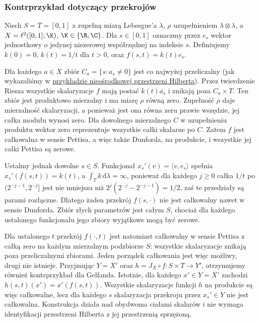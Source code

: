 \subsubsection{Kontrprzykład dotyczący przekrojów}

\begin{przyklad}
\label{ex:weak-fubini-failure15b}
Niech $S=T=[0,1]$ z zupełną miarą Lebesgue'a
$\lambda$, $\rho$ uzupełnieniem $\lambda\otimes\lambda$,
a $X=\ell^2([0,1];\K)$, $\K\in\{\R,\C\}$.
Dla $s\in[0,1]$ oznaczmy przez $e_s$ wektor jednostkowy
o jedynej niezerowej współrzędnej na indeksie $s$.
Definiujemy $k(0)=0$, $k(t)=1/t$ dla $t>0$, oraz
$f(s,t)=k(t)e_s$.

Dla każdego $a\in X$ zbiór $C_a=\{s:a_s\ne0\}$
jest co najwyżej przeliczalny (jak wykazaliśmy
w \hyperref[ex:pettis-not-bochner15b]{przykładzie nieośrodkowej przestrzeni Hilberta}).
Przez twierdzenie Riesza wszystkie skalaryzacje $f$
mają postać $k(t)\overline{a_s}$ i znikają poza
$C_a\times T$. Ten zbiór jest produktowo mierzalny
i ma miarę $\rho$ równą zero. Zupełność $\rho$
daje mierzalność skalaryzacji, a ponieważ jest ona
równa zeru prawie wszędzie, jej całka modułu wynosi zero.
Dla dowolnego mierzalnego $C$ w uzupełnieniu produktu
wektor zero reprezentuje wszystkie całki skalarne
po $C$. Zatem $f$ jest całkowalna w sensie Pettisa,
a więc także Dunforda, na produkcie, i wszystkie
jej całki Pettisa są zerowe.

Ustalmy jednak dowolne $s\in S$. Funkcjonał
$x_s'(v)=\langle v,e_s\rangle$ spełnia
$x_s'(f(s,t))=k(t)$, a $\int_T k\,\mathrm d\lambda=\infty$,
ponieważ dla każdego $j\ge0$ całka $1/t$ po
$(2^{-j-1},2^{-j}]$ jest nie mniejsza niż
$2^j(2^{-j}-2^{-j-1})=1/2$, zaś te przedziały są
parami rozłączne.
Dlatego żaden przekrój $f(s,\cdot)$ nie jest całkowalny
nawet w sensie Dunforda. Zbiór złych parametrów
jest całym $S$, chociaż dla każdego ustalonego
funkcjonału jego zbiory wyjątkowe mogą być zerowe.

Dla ustalonego $t$ przekrój $f(\cdot,t)$ jest natomiast
całkowalny w sensie Pettisa z całką zero na każdym
mierzalnym podzbiorze $S$: wszystkie skalaryzacje
znikają poza przeliczalnymi zbiorami. Jeden porządek
całkowania jest więc możliwy, drugi nie istnieje.
Przyjmując $Y=X'$ oraz $h=J_X\circ f:S\times T\to Y'$,
otrzymujemy również kontrprzykład dla Gelfanda.
Istotnie, dla każdego $x'\in Y=X'$ zachodzi
$h(s,t)(x')=x'(f(s,t))$. Wszystkie skalaryzacje
funkcji $h$ na produkcie są więc całkowalne,
lecz dla każdego $s$ skalaryzacja przekroju przez
$x_s'\in Y$ nie jest całkowalna. Konstrukcja działa
nad obydwoma ciałami skalarów i nie wymaga identyfikacji
przestrzeni Hilberta z jej przestrzenią sprzężoną.
\end{przyklad}

